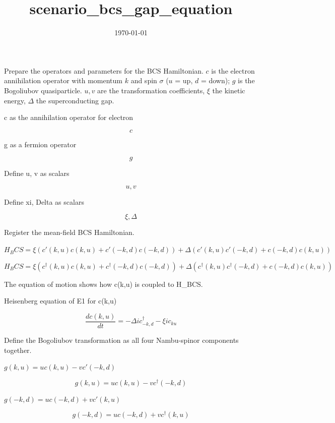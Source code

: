 \documentclass[dvipdfmx]{article}
\title{scenario\_bcs\_gap\_equation}
\date{\today}
\begin{document}
\maketitle

Prepare the operators and parameters for the BCS Hamiltonian. $c$ is the electron annihilation operator with momentum $k$ and spin $\sigma$ ($u$ = up, $d$ = down); $g$ is the Bogoliubov quasiparticle. $u, v$ are the transformation coefficients, $\xi$ the kinetic energy, $\Delta$ the superconducting gap.

c as the annihilation operator for electron

\[
  c
\]

g as a fermion operator

\[
  g
\]

Define u, v as scalars

\[
  u, v
\]

Define xi, Delta as scalars

\[
  \xi, \Delta
\]

Register the mean-field BCS Hamiltonian.

$H_BCS = \xi (c'(k,u) c(k,u) + c'(-k,d) c(-k,d)) + \Delta (c'(k,u) c'(-k,d) + c(-k,d) c(k,u))$

\begin{equation}
  H_BCS = \xi (c^{\dagger}(k,u) c(k,u) + c^{\dagger}(-k,d) c(-k,d)) + \Delta (c^{\dagger}(k,u) c^{\dagger}(-k,d) + c(-k,d) c(k,u))
  \label{eq:E1}
\end{equation}

The equation of motion shows how c(k,u) is coupled to H\_BCS.

Heisenberg equation of E1 for c(k,u)

\begin{equation}
  \frac{d c(k,u)}{d t} = - \Delta \mathit{i} {c}_{-k,d}^{\dagger} - \xi \mathit{i} {c}_{ku}
  \label{eq:E2}
\end{equation}

Define the Bogoliubov transformation as all four Nambu-spinor components together.

$g(k,u) = u c(k,u) - v c'(-k,d)$

\begin{equation}
  g(k,u) = u c(k,u) - v c^{\dagger}(-k,d)
  \label{eq:E3}
\end{equation}

$g(-k,d) = u c(-k,d) + v c'(k,u)$

\begin{equation}
  g(-k,d) = u c(-k,d) + v c^{\dagger}(k,u)
  \label{eq:E4}
\end{equation}
\end{document}
